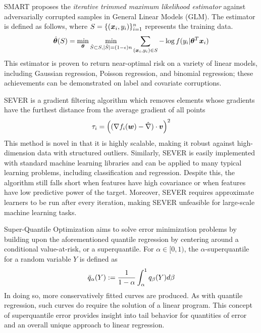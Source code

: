 \documentclass{article} %
\begin{document}
	SMART \cite{https://doi.org/10.48550/arxiv.2206.04777} proposes the \textit{iterative trimmed maximum likelihood estimator} against adversarially corrupted samples in General Linear Models (GLM). The estimator is defined as follows, where $S = \{({\bm{x}}_i,y_i)\}_{i=1}^n$ represents the training data. \vspace{1em}
	\begin{equation}
		\hat{{\bm{\theta}}}(S) = \min_{{\bm{\theta}}} \min_{\hat{S} \subset S, |\hat{S}| = (1-{\epsilon})n} \sum_{({\bm{x}}_i,y_i) \in S} -\log f(y_i|{\bm{\theta}}^T{\bm{x}}_i)
	\end{equation}
	This estimator is proven to return near-optimal risk on a variety of linear models, including Gaussian regression, Poisson regression, and binomial regression; these achievements can be demonstrated on label and covariate corruptions.
	
	
	SEVER \cite{DiakonikolasKKLSS19} is a gradient filtering algorithm which removes elements whose gradients have the furthest distance from the average gradient of all points
	\begin{equation}
		\tau_i = \left((\nabla f_i({\bm{w}}) - \hat{\nabla})\cdot {\bm{v}}\right)^2
	\end{equation}
	This method is novel in that it is highly scalable, making it robust against high-dimension data with structured outliers. Similarly, SEVER is easily implemented with standard machine learning libraries and can be applied to many typical learning problems, including classification and regression. Despite this, the algorithm still falls short when features have high covariance or when features have low predictive power of the target. Moreover, SEVER requires approximate learners to be run after every iteration, making SEVER unfeasible for large-scale machine learning tasks. 
	
	Super-Quantile Optimization \cite{ROCKAFELLAR2014140} aims to solve error minimization problems by building upon the aforementioned quantile regression by centering around a conditional value-at-risk, or a superquantile. For $\alpha \in [0,1)$, the $\alpha$-superquantile for a random variable $Y$ is defined as \begin{equation}
		\Bar{q}_\alpha (Y) := \frac{1}{1-\alpha} \int_\alpha^1 q_\beta (Y) d\beta
	\end{equation}
	In doing so, more conservatively fitted curves are produced. As with quantile regression, such curves do require the solution of a linear program.
	This concept of superquantile error provides insight into tail behavior for quantities of error and an overall unique approach to linear regression.
	
\end{document}
